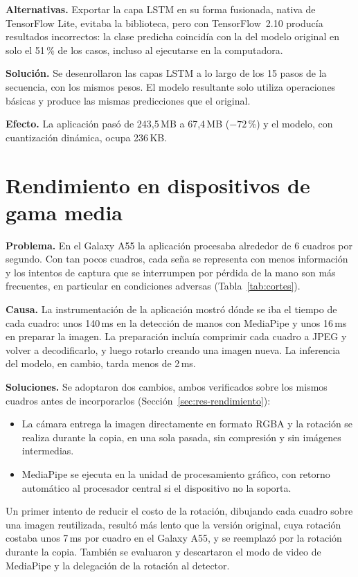 \textbf{Alternativas.} Exportar la capa LSTM en su forma fusionada, nativa de TensorFlow Lite, evitaba la biblioteca, pero con TensorFlow~2.10 producía resultados incorrectos: la clase predicha coincidía con la del modelo original en solo el 51\,\% de los casos, incluso al ejecutarse en la computadora.

\textbf{Solución.} Se desenrollaron las capas LSTM a lo largo de los 15 pasos de la secuencia, con los mismos pesos. El modelo resultante solo utiliza operaciones básicas y produce las mismas predicciones que el original.

\textbf{Efecto.} La aplicación pasó de 243,5\,MB a 67,4\,MB ($-72$\,\%) y el modelo, con cuantización dinámica, ocupa 236\,KB.

\section{Rendimiento en dispositivos de gama media}

\textbf{Problema.} En el Galaxy A55 la aplicación procesaba alrededor de 6 cuadros por segundo. Con tan pocos cuadros, cada seña se representa con menos información y los intentos de captura que se interrumpen por pérdida de la mano son más frecuentes, en particular en condiciones adversas (Tabla~\ref{tab:cortes}).

\textbf{Causa.} La instrumentación de la aplicación mostró dónde se iba el tiempo de cada cuadro: unos 140\,ms en la detección de manos con MediaPipe y unos 16\,ms en preparar la imagen. La preparación incluía comprimir cada cuadro a JPEG y volver a decodificarlo, y luego rotarlo creando una imagen nueva. La inferencia del modelo, en cambio, tarda menos de 2\,ms.

\textbf{Soluciones.} Se adoptaron dos cambios, ambos verificados sobre los mismos cuadros antes de incorporarlos (Sección~\ref{sec:res-rendimiento}):

\begin{itemize}
    \item La cámara entrega la imagen directamente en formato RGBA y la rotación se realiza durante la copia, en una sola pasada, sin compresión y sin imágenes intermedias.
    \item MediaPipe se ejecuta en la unidad de procesamiento gráfico, con retorno automático al procesador central si el dispositivo no la soporta.
\end{itemize}

Un primer intento de reducir el costo de la rotación, dibujando cada cuadro sobre una imagen reutilizada, resultó más lento que la versión original, cuya rotación costaba unos 7\,ms por cuadro en el Galaxy A55, y se reemplazó por la rotación durante la copia.
 También se evaluaron y descartaron el modo de video de MediaPipe y la delegación de la rotación al detector.

